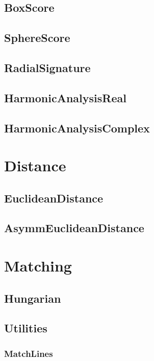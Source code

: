 \documentclass{ol-softwaremanual}
\begin{document}
\subsection{BoxScore}

\subsection{SphereScore}

\subsection{RadialSignature}

\subsection{HarmonicAnalysisReal}

\subsection{HarmonicAnalysisComplex}

\section{Distance}
\subsection{EuclideanDistance}

\subsection{AsymmEuclideanDistance}

\section{Matching}

\subsection{Hungarian}

\subsection{Utilities}
\subsubsection{MatchLines}
\end{document}
